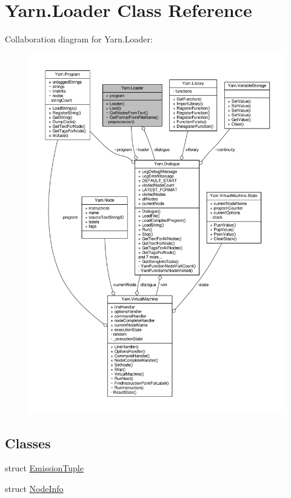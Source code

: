\hypertarget{a00127}{\section{Yarn.\-Loader Class Reference}
\label{a00127}
}


Collaboration diagram for Yarn.\-Loader\-:
\nopagebreak
\begin{figure}[H]
\begin{center}
\leavevmode
\includegraphics[width=350pt]{a00617}
\end{center}
\end{figure}
\subsection*{Classes}
\begin{DoxyCompactItemize}
\item 
struct \hyperlink{a00095}{Emission\-Tuple}
\item 
struct \hyperlink{a00133}{Node\-Info}
\end{DoxyCompactItemize}
